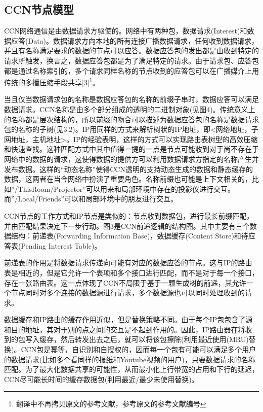 \subsection*{CCN节点模型}
CCN网络通信是由数据请求方驱使的。网络中有两种包，数据请求(Interest)和数据应答(Data)。数据请求方向本地的所有连接广播数据请求，任何收到数据请求，并且有名称满足要求的数据的节点可以应答。数据应答包的发出都是由收到特定的请求所触发，换言之，数据应答包都是为了满足特定的请求。由于请求包、应答包都是通过名称索引的，多个请求同样名称的节点收到的应答包可以在广播媒介上用传统的多播压缩手段共享[3]\footnote{翻译中不再拷贝原文的参考文献，参考原文的参考文献编号}。
\par
当且仅当数据请求包的名称是数据应答包的名称的前缀子串时，数据应答可以满足数据请求。CCN名称是由多个部分组成的透明的二进制对象(见图4)。传统意义上的名称都是层次结构的，所以前缀的吻合可以描述为数据应答包的名称是数据请求包的名称的子树(见3.2)。IP用同样的方式来解析树状的IP地址，即<网络地址，子网地址，主机地址>。IP的经验表明，这样的方式可以实现路由表树型的高效压缩和快速查找。这种匹配方式中其中值得一提的一点是节点可能收到对于尚不存在于网络中的数据的请求，这使得数据的提供方可以利用数据请求方指定的名称产生并发布数据。这样的“动态名称”使得CCN透明的支持动态生成的数据和静态缓存的数据，这两者在当今网络中扮演了重要角色。名称前缀也可能是上下文相关的，比如”/ThisRoom/Projector”可以用来和局部环境中存在的投影仪进行交互。而”/Local/Friends”可以和局部环境中的朋友进行交互。
\par
CCN节点的工作方式和IP节点是类似的：节点收到数据包，进行最长前缀匹配，并由匹配结果决定下一步行动。图3是CCN前递逻辑的结构图。其中主要有三个数据结构：前递表(Forwarding Information Base)，数据缓存(Content Store)和待应答表(Pending Interest Table)。
\par
前递表的作用是将数据请求传递向可能有对应的数据应答的节点。这与IP的路由表是相近的，但是它允许一个表项和多个接口进行匹配，而不是对于每一个接口，存在一张路由表。这一点体现了CCN不局限于基于一颗生成树的前递，其允许一个节点同时对多个连接的数据源进行请求，多个数据源也可以同时处理收到的请求。
\par
数据缓存和IP路由的缓存作用近似，但是替换策略不同。由于每个IP包包含了源和目的地址，其对于别的点之间的交互是不起到作用的。因此，IP路由器在将收到的包写入缓存，然后转发出去之后，就可以将该包擦除(利用最近使用(MRU)替换)。CCN包是幂等，自识别和自授权的，因而每一个包有可能可以满足多个用户的数据请求(比如多个看同样的报纸和Youtube视频的用户)，只要数据请求的名称匹配。为了最大化数据共享的可能性，从而最小化上行带宽的占用和下行的延迟，CCN尽可能长时间的缓存数据包(利用最近/最少未使用替换)。
\par
